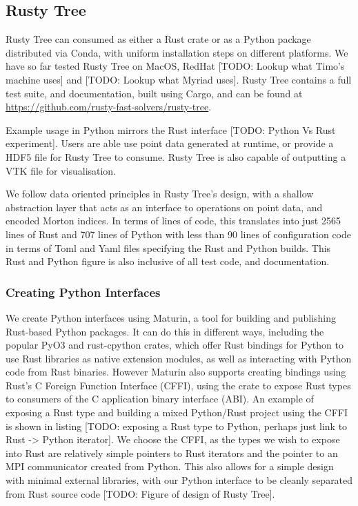 \subsection*{Rusty Tree}

Rusty Tree can consumed as either a Rust crate or as a Python package distributed via Conda, with uniform installation steps on different platforms. We have so far tested Rusty Tree on MacOS, RedHat [TODO: Lookup what Timo's machine uses] and [TODO: Lookup what Myriad uses]. Rusty Tree contains a full test suite, and documentation, built using Cargo, and can be found at \url{https://github.com/rusty-fast-solvers/rusty-tree}.

Example usage in Python mirrors the Rust interface [TODO: Python Vs Rust experiment]. Users are able use point data generated at runtime, or provide a HDF5 file for Rusty Tree to consume. Rusty Tree is also capable of outputting a VTK file for visualisation.

We follow data oriented principles in Rusty Tree's design, with a shallow abstraction layer that acts as an interface to operations on point data, and encoded Morton indices. In terms of lines of code, this translates into just 2565 lines of Rust and 707 lines of Python with less than 90 lines of configuration code in terms of Toml and Yaml files specifying the Rust and Python builds. This Rust and Python figure is also inclusive of all test code, and documentation. 

\subsubsection*{Creating Python Interfaces}

We create Python interfaces using Maturin, a tool for building and publishing Rust-based Python packages. It can do this in different ways, including the popular PyO3 \cite{pyo32022github} and rust-cpython \cite{rustcpython2022github} crates, which offer Rust bindings for Python to use Rust libraries as native extension modules, as well as interacting with Python code from Rust binaries. However Maturin also supports creating bindings using Rust's C Foreign Function Interface (CFFI), using the  crate to expose Rust types to consumers of the C application binary interface (ABI). An example of exposing a Rust type and building a mixed Python/Rust project using the CFFI is shown in listing [TODO: exposing a Rust type to Python, perhaps just link to Rust -> Python iterator]. We choose the CFFI, as the types we wish to expose into Rust are relatively simple pointers to Rust iterators and the pointer to an MPI communicator created from Python. This also allows for a simple design with minimal external libraries, with our Python interface to be cleanly separated from Rust source code [TODO: Figure of design of Rusty Tree].

